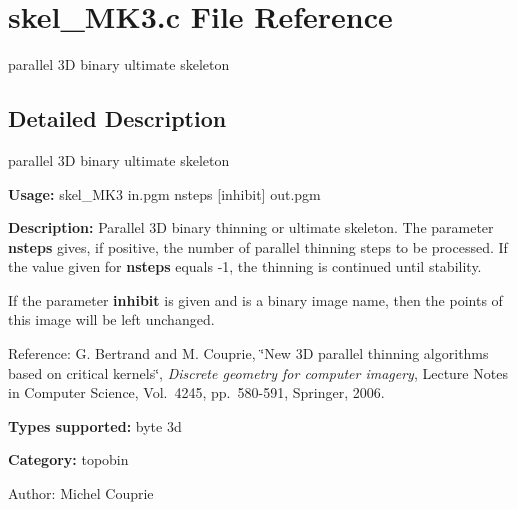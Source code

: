 \section{skel\_\-MK3.c File Reference}
\label{skel__MK3_8c}
parallel 3D binary ultimate skeleton 



\subsection{Detailed Description}
parallel 3D binary ultimate skeleton 

{\bf Usage:} skel\_\-MK3 in.pgm nsteps [inhibit] out.pgm

{\bf Description:} Parallel 3D binary thinning or ultimate skeleton. The parameter {\bf nsteps} gives, if positive, the number of parallel thinning steps to be processed. If the value given for {\bf nsteps} equals -1, the thinning is continued until stability.

If the parameter {\bf inhibit} is given and is a binary image name, then the points of this image will be left unchanged.

Reference: G. Bertrand and M. Couprie, \char`\"{}New 3D parallel thinning algorithms based on critical kernels\char`\"{}, {\em Discrete geometry for computer imagery\/}, Lecture Notes in Computer Science, Vol.~4245, pp.~580-591, Springer, 2006.

{\bf Types supported:} byte 3d

{\bf Category:} topobin

\begin{Desc}
\item[Author:]Michel Couprie \end{Desc}

